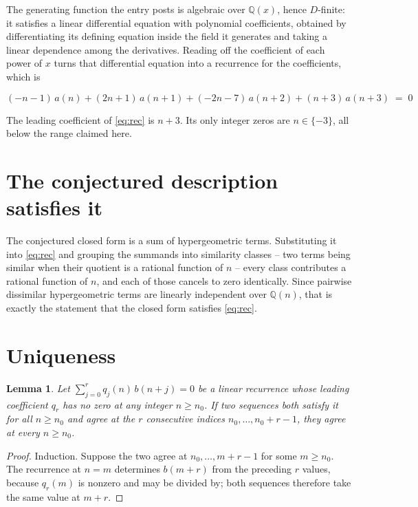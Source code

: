 \documentclass[11pt,a4paper]{article}
\theoremstyle{plain}
\newtheorem{lemma}[theorem]{Lemma}
\theoremstyle{definition}
\begin{document}
The generating function the entry posts is algebraic over $\mathbb{Q}(x)$, hence $D$-finite: it satisfies a linear differential equation with polynomial coefficients, obtained by differentiating its defining equation inside the field it generates and taking a linear dependence among the derivatives. Reading off the coefficient of each power of $x$ turns that differential equation into a recurrence for the coefficients, which is

\begin{equation}\label{eq:rec}
\left(- n - 1\right)\,a(n) + \left(2 n + 1\right)\,a(n+1) + \left(- 2 n - 7\right)\,a(n+2) + \left(n + 3\right)\,a(n+3) \;=\; 0
\end{equation}

The leading coefficient of \eqref{eq:rec} is $n + 3$. Its only integer zeros are $n\in\{-3\}$, all below the range claimed here.

\section{The conjectured description satisfies it}

The conjectured closed form is a sum of hypergeometric terms. Substituting it into \eqref{eq:rec} and grouping the summands into similarity classes -- two terms being similar when their quotient is a rational function of $n$ -- every class contributes a rational function of $n$, and each of those cancels to zero identically. Since pairwise dissimilar hypergeometric terms are linearly independent over $\mathbb{Q}(n)$, that is exactly the statement that the closed form satisfies \eqref{eq:rec}.

\section{Uniqueness}

\begin{lemma}\label{lem:unique}
Let $\sum_{j=0}^{r}q_{j}(n)\,b(n+j)=0$ be a linear recurrence whose leading coefficient
$q_{r}$ has no zero at any integer $n\ge n_{0}$. If two sequences both satisfy it for all
$n\ge n_{0}$ and agree at the $r$ consecutive indices $n_{0},\dots,n_{0}+r-1$, they agree
at every $n\ge n_{0}$.
\end{lemma}

\begin{proof}
Induction. Suppose the two agree at $n_{0},\dots,m+r-1$ for some $m\ge n_{0}$. The
recurrence at $n=m$ determines $b(m+r)$ from the preceding $r$ values, because $q_{r}(m)$
is nonzero and may be divided by; both sequences therefore take the same value at $m+r$.
\end{proof}
\end{document}
